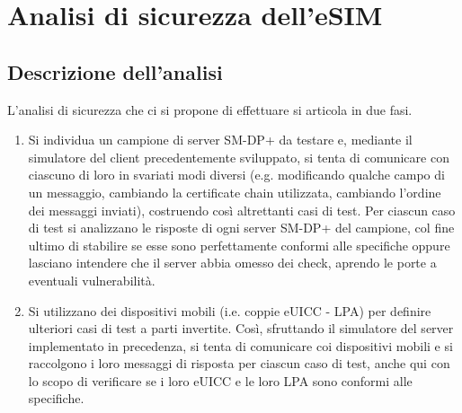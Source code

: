 \documentclass[10pt, oneside]{book}
\begin{document}
\chapter{Analisi di sicurezza dell'eSIM}
\section{Descrizione dell'analisi}
L'analisi di sicurezza che ci si propone di effettuare si articola in due fasi.
\begin{enumerate}
\item Si individua un campione di server SM-DP+ da testare e, mediante il simulatore del client precedentemente sviluppato, si tenta di comunicare con ciascuno di loro in svariati modi diversi (e.g. modificando qualche campo di un messaggio, cambiando la certificate chain utilizzata, cambiando l'ordine dei messaggi inviati), costruendo così altrettanti casi di test. Per ciascun caso di test si analizzano le risposte di ogni server SM-DP+ del campione, col fine ultimo di stabilire se esse sono perfettamente conformi alle specifiche oppure lasciano intendere che il server abbia omesso dei check, aprendo le porte a eventuali vulnerabilità.
\item Si utilizzano dei dispositivi mobili (i.e. coppie eUICC - LPA) per definire ulteriori casi di test a parti invertite. Così, sfruttando il simulatore del server implementato in precedenza, si tenta di comunicare coi dispositivi mobili e si raccolgono i loro messaggi di risposta per ciascun caso di test, anche qui con lo scopo di verificare se i loro eUICC e le loro LPA sono conformi alle specifiche.
\end{enumerate}
\end{document}
